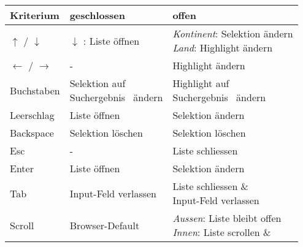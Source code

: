 \begin{table}[!htb]
    \label{table:interactionCountryInput}
    \footnotesize
    \begin{adjustbox}{max width=\textwidth}
        \begin{threeparttable}
            \begin{tabular}{ l || l | l }
                \bf{Kriterium}    & \bf{geschlossen} & \bf{offen} \\
                \hline \hline
                $\uparrow$ / $\downarrow$    & $\downarrow$ : Liste öffnen & \tbbr{\emph{Kontinent}: Selektion ändern \\ 
                                                                                   \emph{Land}: Highlight ändern}  \\
                \hline
                $\leftarrow$ / $\rightarrow$ & -                           & Highlight ändern                      \\
                \hline
                Buchstaben & \tbbr{Selektion auf \\ 
                                   Suchergebnis\tnote{1} \ ändern}         & \tbbr{Highlight auf \\ 
                                                                                   Suchergebnis\tnote{1} \ ändern} \\
                \hline
                Leerschlag & Liste öffnen                    & Selektion ändern  \\
                \hline
                Backspace  & Selektion löschen               & Selektion löschen \\
                \hline
                Esc        & -                               & Liste schliessen  \\
                \hline \hline
                Enter      & Liste öffnen                    & Selektion ändern  \\
                \hline
                Tab        & Input-Feld verlassen            & \tbbr{Liste schliessen \& \\ 
                                                                     Input-Feld verlassen }                 \\
                \hline \hline
                Scroll     & Browser-Default\tnote{2}        & \tbbr{\emph{Aussen}: Liste bleibt offen \\
                                                                     \emph{Innen}: Liste scrollen \& \\ 
}
\end{tabular}
\end{threeparttable}
\end{adjustbox}
\end{table}
